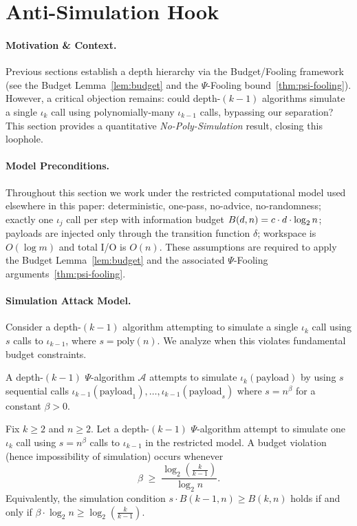 \section{Anti-Simulation Hook}
\label{AntiSim:sec:hook}

\paragraph{Motivation \& Context.}
Previous sections establish a depth hierarchy via the Budget/Fooling framework (see the Budget Lemma~\ref{lem:budget} and the $\Psi$-Fooling bound~\ref{thm:psi-fooling}). However, a critical objection remains: could depth-\((k{-}1)\) algorithms simulate a single $\iota_k$ call using polynomially-many $\iota_{k-1}$ calls, bypassing our separation? This section provides a quantitative \emph{No-Poly-Simulation} result, closing this loophole.

\paragraph{Model Preconditions.}
Throughout this section we work under the restricted computational model used elsewhere in this paper:
deterministic, one-pass, no-advice, no-randomness; exactly one $\iota_j$ call per step with information budget $\B(d,n)=c \cdot d \cdot \log_{2} n$; payloads are injected only through the transition function $\delta$; workspace is $O(\log m)$ and total I/O is $O(n)$. These assumptions are required to apply the Budget Lemma~\ref{lem:budget} and the associated $\Psi$-Fooling arguments~\ref{thm:psi-fooling}.

\paragraph{Simulation Attack Model.}
Consider a depth-\((k{-}1)\) algorithm attempting to simulate a single $\iota_k$ call using $s$ calls to $\iota_{k-1}$, where $s = \text{poly}(n)$. We analyze when this violates fundamental budget constraints.

\begin{definition}
\label{AntiSim:def:simulation}
A depth-\((k{-}1)\) $\Psi$-algorithm $\mathcal{A}$ attempts to simulate $\iota_k(\text{payload})$ by using $s$ sequential calls $\iota_{k-1}(\text{payload}_1),\ldots,\iota_{k-1}(\text{payload}_s)$ where $s = n^\beta$ for a constant $\beta > 0$.
\end{definition}

\begin{theorem}
\label{AntiSim:thm:no-poly-sim}
Fix $k \geq 2$ and $n \geq 2$. Let a depth-\((k{-}1)\) $\Psi$-algorithm attempt to simulate one $\iota_k$ call using $s = n^\beta$ calls to $\iota_{k-1}$ in the restricted model. A budget violation (hence impossibility of simulation) occurs whenever
\[
  \beta \;\geq\; \frac{\log_{2}\!\left(\tfrac{k}{k-1}\right)}{\log_{2} n}.
\]
Equivalently, the simulation condition $s\cdot B(k{-}1,n) \geq B(k,n)$ holds if and only if $\beta \cdot \log_{2} n \geq \log_{2}\!\left(\tfrac{k}{k-1}\right)$.
\end{theorem}

